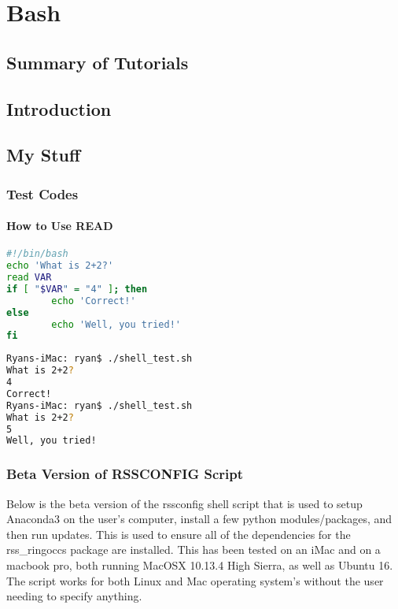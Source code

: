 \documentclass[crop=false,class=book]{standalone}
\begin{document}
\chapter{Bash}
\section{Summary of Tutorials}
\section{Introduction}
\section{My Stuff}
\subsection{Test Codes}
\subsubsection{How to Use READ}
\begin{minipage}[t]{.48\textwidth}
\centering
\begin{lstlisting}[language=bash,basicstyle=\small\ttfamily,frame=single,caption=Using the READ command to request input]
#!/bin/bash
echo 'What is 2+2?'
read VAR
if [ "$VAR" = "4" ]; then
        echo 'Correct!'
else
        echo 'Well, you tried!'
fi
\end{lstlisting}
\end{minipage}\hfill
\begin{minipage}[t]{.48\textwidth}
\centering
\begin{lstlisting}[language=bash,basicstyle=\small\ttfamily,frame=single,caption=output]
Ryans-iMac: ryan$ ./shell_test.sh 
What is 2+2?
4
Correct!
Ryans-iMac: ryan$ ./shell_test.sh 
What is 2+2?
5
Well, you tried!
\end{lstlisting}
\end{minipage}
\subsection{Beta Version of RSSCONFIG Script}
Below is the beta version of the rssconfig shell script that is used to setup Anaconda3 on the user's computer, install a few python modules/packages, and then run updates. This is used to ensure all of the dependencies for the rss\_ringoccs package are installed. This has been tested on an iMac and on a macbook pro, both running MacOSX 10.13.4 High Sierra, as well as Ubuntu 16. The script works for both Linux and Mac operating system's without the user needing to specify anything.
\clearpage
\end{document}

